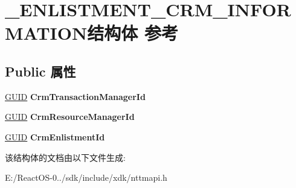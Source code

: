 \hypertarget{struct___e_n_l_i_s_t_m_e_n_t___c_r_m___i_n_f_o_r_m_a_t_i_o_n}{}\section{\+\_\+\+E\+N\+L\+I\+S\+T\+M\+E\+N\+T\+\_\+\+C\+R\+M\+\_\+\+I\+N\+F\+O\+R\+M\+A\+T\+I\+O\+N结构体 参考}
\label{struct___e_n_l_i_s_t_m_e_n_t___c_r_m___i_n_f_o_r_m_a_t_i_o_n}
\subsection*{Public 属性}
\begin{DoxyCompactItemize}
\item 
\mbox{\label{struct___e_n_l_i_s_t_m_e_n_t___c_r_m___i_n_f_o_r_m_a_t_i_o_n_a5790cff211707d64fcc5e6551a3c0ae5}} 
\hyperlink{interface_g_u_i_d}{G\+U\+ID} {\bfseries Crm\+Transaction\+Manager\+Id}
\item 
\mbox{\label{struct___e_n_l_i_s_t_m_e_n_t___c_r_m___i_n_f_o_r_m_a_t_i_o_n_abaeb22eb9a5b5318df1a8e70a8306f3d}} 
\hyperlink{interface_g_u_i_d}{G\+U\+ID} {\bfseries Crm\+Resource\+Manager\+Id}
\item 
\mbox{\label{struct___e_n_l_i_s_t_m_e_n_t___c_r_m___i_n_f_o_r_m_a_t_i_o_n_a21156e8fc873b62a573f8167157f48e2}} 
\hyperlink{interface_g_u_i_d}{G\+U\+ID} {\bfseries Crm\+Enlistment\+Id}
\end{DoxyCompactItemize}


该结构体的文档由以下文件生成\+:\begin{DoxyCompactItemize}
\item 
E\+:/\+React\+O\+S-\/0../sdk/include/xdk/nttmapi.\+h\end{DoxyCompactItemize}
